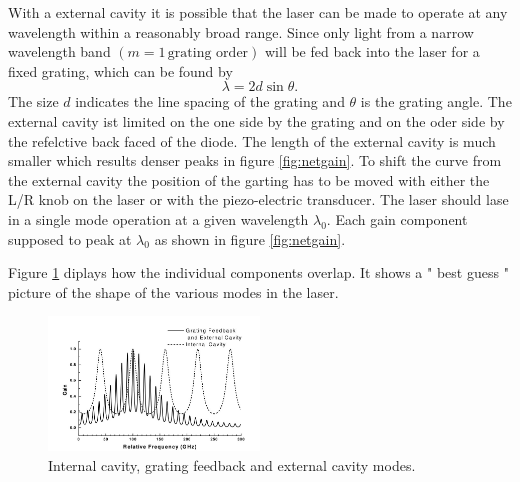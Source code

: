 With a external cavity it is possible that the laser can be made to operate at any wavelength within a reasonably broad range.
Since only light from a narrow wavelength band $\left(m = 1  \,\text{grating order}\right)$ will be fed back into the laser for a fixed grating,
which can be found by 
\begin{equation}
    \lambda = 2 d \sin \theta.
\end{equation}
The size $d$ indicates the line spacing of the grating and $\theta$ is the grating angle. The external cavity ist limited on the one side by the grating and on the
oder side by the refelctive back faced  of the diode. The length of the external cavity is much smaller which results denser peaks in figure \ref{fig:netgain}.
To shift the curve from the external cavity the position of the garting has to be moved with either the L/R knob on the laser or with the piezo-electric transducer.
The laser should lase in a single mode operation at a given wavelength $\lambda_0$. Each gain component supposed to peak at $\lambda_0$ as shown in figure \ref{fig:netgain}.

Figure \ref{fig:best} diplays how the individual components overlap. It shows a " best guess " picture of the shape of the various modes in the laser.
\begin{figure}[H]
    \centering
    \includegraphics[width=0.5\textwidth]{content/graphics/best-guess.jpg}
    \caption{Internal cavity, grating feedback and external cavity modes.\cite{diode_laser}}
    \label{fig:best} 
\end{figure}

